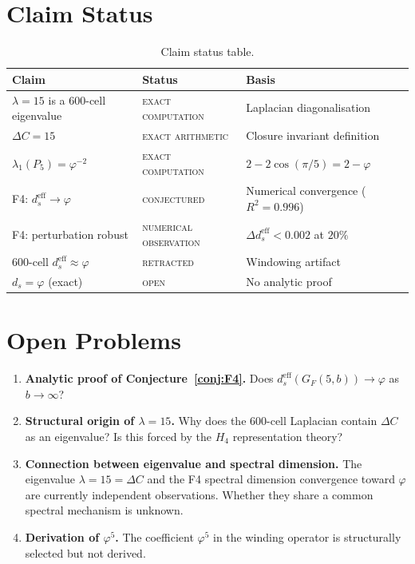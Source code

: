 \documentclass[12pt]{article}
\newcommand{\phig}{\varphi}
\newcommand{\ds}{d_s}
\newcommand{\dseff}{d_s^{\mathrm{eff}}}
\begin{document}
\section{Claim Status}\label{sec:status}

\begin{table}[ht]
\centering
\caption{Claim status table.}
\label{tab:status}
\begin{tabular}{@{}lll@{}}
\toprule
Claim & Status & Basis \\
\midrule
$\lambda = 15$ is a 600-cell eigenvalue & \textsc{exact computation} & Laplacian diagonalisation \\
$\Delta C = 15$ & \textsc{exact arithmetic} & Closure invariant definition \\
$\lambda_1(P_5) = \phig^{-2}$ & \textsc{exact computation} & $2 - 2\cos(\pi/5) = 2 - \phig$ \\
F4: $\dseff \to \phig$ & \textsc{conjectured} & Numerical convergence ($R^2 = 0.996$) \\
F4: perturbation robust & \textsc{numerical observation} & $\Delta \dseff < 0.002$ at $20\%$ \\
600-cell $\dseff \approx \phig$ & \textsc{retracted} & Windowing artifact \\
$\ds = \phig$ (exact) & \textsc{open} & No analytic proof \\
\bottomrule
\end{tabular}
\end{table}

\section{Open Problems}\label{sec:open}

\begin{enumerate}
    \item \textbf{Analytic proof of Conjecture~\ref{conj:F4}.} Does $\dseff(G_F(5,b)) \to \phig$ as $b \to \infty$?
    \item \textbf{Structural origin of $\lambda = 15$.} Why does the 600-cell Laplacian contain $\Delta C$ as an eigenvalue? Is this forced by the $H_4$ representation theory?
    \item \textbf{Connection between eigenvalue and spectral dimension.} The eigenvalue $\lambda = 15 = \Delta C$ and the F4 spectral dimension convergence toward $\phig$ are currently independent observations. Whether they share a common spectral mechanism is unknown.
    \item \textbf{Derivation of $\phig^5$.} The coefficient $\phig^5$ in the winding operator is structurally selected but not derived.
\end{enumerate}
\end{document}
